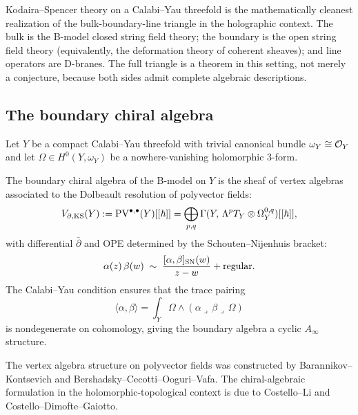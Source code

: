 Kodaira--Spencer theory on a Calabi--Yau threefold is the
mathematically cleanest realization of the bulk-boundary-line
triangle in the holographic context. The bulk is the B-model
closed string field theory; the boundary is the open string field
theory (equivalently, the deformation theory of coherent sheaves);
and line operators are D-branes. The full triangle is a theorem
in this setting, not merely a conjecture, because both sides admit
complete algebraic descriptions.

\subsection{The boundary chiral algebra}

Let $Y$ be a compact Calabi--Yau threefold with trivial canonical
bundle $\omega_Y\cong\mathcal O_Y$ and let $\Omega\in H^0(Y,\omega_Y)$
be a nowhere-vanishing holomorphic $3$-form.

\begin{definition}
The boundary chiral algebra of the B-model on $Y$ is the sheaf of
vertex algebras associated to the Dolbeault resolution of polyvector
fields:
\begin{equation}%
V_{\partial,\mathrm{KS}}(Y)
:= \PV^{\bullet,\bullet}(Y)[[\hbar]]
= \bigoplus_{p,q}
\Gamma(Y,\,\Lambda^p T_Y\otimes\Omega^{0,q}_Y)[[\hbar]],
\end{equation}
with differential $\bar\partial$ and OPE determined by the
Schouten--Nijenhuis bracket:
\begin{equation}%
\alpha(z)\,\beta(w)
\;\sim\;
\frac{[\alpha,\beta]_{\sn}(w)}{z-w}
+ \text{regular}.
\end{equation}
The Calabi--Yau condition ensures that the trace pairing
\begin{equation}%
\langle\alpha,\beta\rangle
= \int_Y \Omega\wedge(\alpha\lrcorner\,\beta\lrcorner\,\Omega)
\end{equation}
is nondegenerate on cohomology, giving the boundary algebra a
cyclic $A_\infty$ structure.
\end{definition}

\begin{remark}
The vertex algebra structure on polyvector fields was constructed
by Barannikov--Kontsevich and Bershadsky--Cecotti--Ooguri--Vafa.
The chiral-algebraic formulation in the holomorphic-topological
context is due to Costello--Li and Costello--Dimofte--Gaiotto.
\end{remark}

